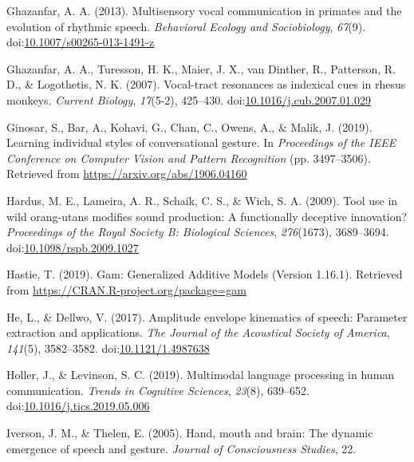 \documentclass[
  man,floatsintext]{apa6}
\newlength{\cslhangindent}
\newenvironment{cslreferences}%
  {\setlength{\parindent}{0pt}%
  \everypar{\setlength{\hangindent}{\cslhangindent}}\ignorespaces}%
  {\par}
\begin{document}
\begin{cslreferences}
\leavevmode\hypertarget{ref-ghazanfarMultisensoryVocalCommunication2013}{}%
Ghazanfar, A. A. (2013). Multisensory vocal communication in primates and the evolution of rhythmic speech. \emph{Behavioral Ecology and Sociobiology}, \emph{67}(9). doi:\href{https://doi.org/10.1007/s00265-013-1491-z}{10.1007/s00265-013-1491-z}

\leavevmode\hypertarget{ref-ghazanfarVocaltractResonancesIndexical2007}{}%
Ghazanfar, A. A., Turesson, H. K., Maier, J. X., van Dinther, R., Patterson, R. D., \& Logothetis, N. K. (2007). Vocal-tract resonances as indexical cues in rhesus monkeys. \emph{Current Biology}, \emph{17}(5-2), 425--430. doi:\href{https://doi.org/10.1016/j.cub.2007.01.029}{10.1016/j.cub.2007.01.029}

\leavevmode\hypertarget{ref-ginosarLearningIndividualStyles2019}{}%
Ginosar, S., Bar, A., Kohavi, G., Chan, C., Owens, A., \& Malik, J. (2019). Learning individual styles of conversational gesture. In \emph{Proceedings of the IEEE Conference on Computer Vision and Pattern Recognition} (pp. 3497--3506). Retrieved from \url{https://arxiv.org/abs/1906.04160}

\leavevmode\hypertarget{ref-hardusToolUseWild2009}{}%
Hardus, M. E., Lameira, A. R., Schaik, C. S., \& Wich, S. A. (2009). Tool use in wild orang-utans modifies sound production: A functionally deceptive innovation? \emph{Proceedings of the Royal Society B: Biological Sciences}, \emph{276}(1673), 3689--3694. doi:\href{https://doi.org/10.1098/rspb.2009.1027}{10.1098/rspb.2009.1027}

\leavevmode\hypertarget{ref-hastieGamGeneralizedAdditive2019}{}%
Hastie, T. (2019). Gam: Generalized Additive Models (Version 1.16.1). Retrieved from \url{https://CRAN.R-project.org/package=gam}

\leavevmode\hypertarget{ref-heAmplitudeEnvelopeKinematics2017a}{}%
He, L., \& Dellwo, V. (2017). Amplitude envelope kinematics of speech: Parameter extraction and applications. \emph{The Journal of the Acoustical Society of America}, \emph{141}(5), 3582--3582. doi:\href{https://doi.org/10.1121/1.4987638}{10.1121/1.4987638}

\leavevmode\hypertarget{ref-hollerMultimodalLanguageProcessing2019}{}%
Holler, J., \& Levinson, S. C. (2019). Multimodal language processing in human communication. \emph{Trends in Cognitive Sciences}, \emph{23}(8), 639--652. doi:\href{https://doi.org/10.1016/j.tics.2019.05.006}{10.1016/j.tics.2019.05.006}

\leavevmode\hypertarget{ref-iversonHandMouthBrain2005}{}%
Iverson, J. M., \& Thelen, E. (2005). Hand, mouth and brain: The dynamic emergence of speech and gesture. \emph{Journal of Consciousness Studies}, 22.


\end{cslreferences}
\end{document}
